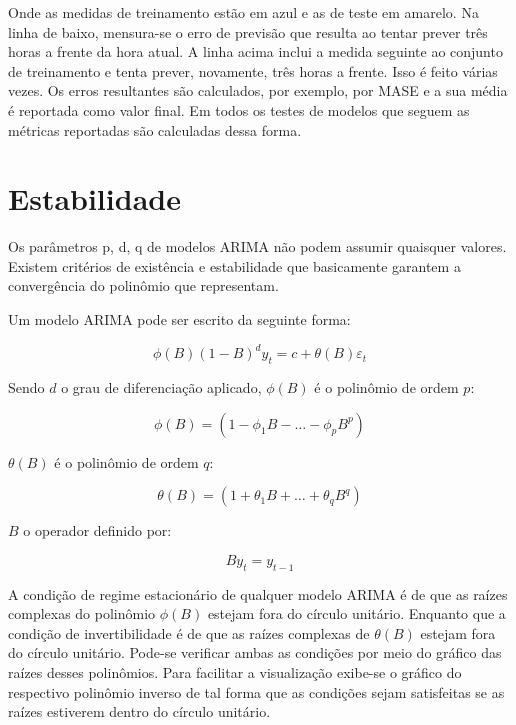 \documentclass[
	12pt,				%
	openright,			%
	oneside,			%
	a4paper,			%
	english,			%
	french,				%
	spanish,			%
	brazil				%
	]{abntex2}
\begin{document}
Onde as medidas de treinamento estão em azul e as de teste em amarelo. Na linha de baixo, mensura-se o erro de previsão que resulta ao tentar prever três horas a frente da hora atual. A linha acima inclui a medida seguinte ao conjunto de treinamento e tenta prever, novamente, três horas a frente. Isso é feito várias vezes. Os erros resultantes são calculados, por exemplo, por MASE e a sua média é reportada como valor final. Em todos os testes de modelos que seguem as métricas reportadas são calculadas dessa forma.

\section{Estabilidade}

Os parâmetros p, d, q de modelos ARIMA não podem assumir quaisquer valores. Existem critérios de existência e estabilidade que basicamente garantem a convergência do polinômio que representam.

Um modelo ARIMA pode ser escrito da seguinte forma: 


\begin{equation}
\phi(B)(1-B)^dy_t = c + \theta(B)\varepsilon_t
\end{equation}

Sendo $d$ o grau de diferenciação aplicado, $\phi(B)$ é o polinômio de ordem $p$:

\begin{equation}
\phi(B) = (1-\phi_1B-\dots-\phi_pB^p)
\end{equation}

$\theta(B)$ é o polinômio de ordem $q$:

\begin{equation}
\theta(B) = (1+\theta_1B+\dots+\theta_qB^q)
\end{equation}

$B$ o operador definido por:

\begin{equation}
By_{t} = y_{t-1}
\end{equation}

A condição de regime estacionário de qualquer modelo ARIMA é de que as raízes complexas do polinômio $\phi(B)$ estejam fora do círculo unitário. Enquanto que a condição de invertibilidade é de que as raízes complexas de $\theta(B)$ estejam fora do círculo unitário. Pode-se verificar ambas as condições por meio do gráfico das raízes desses polinômios. Para facilitar a visualização exibe-se o gráfico do respectivo polinômio inverso de tal forma que as condições sejam satisfeitas se as raízes estiverem dentro do círculo unitário.
\end{document}
